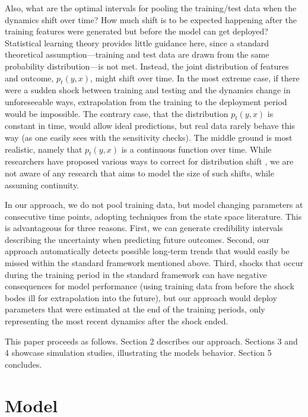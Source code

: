 \documentclass{article}
\begin{document}
Also, what are the optimal intervals for pooling the training/test data when the dynamics shift over time? How much shift is to be expected happening after the training features were generated but before the model can get deployed? Statistical learning theory provides little guidance here, since a standard theoretical assumption---training and test data are drawn from the same probability distribution---is not met. Instead, the joint distribution of features and outcome, $p_t(y, x)$, might shift over time. In the most extreme case, if there were a sudden shock between training and testing and the dynamics change in unforeseeable ways, extrapolation from the training to the deployment period would be impossible. The contrary case, that the distribution $p_t(y, x)$ is constant in time, would allow ideal predictions, but real data rarely behave this way (as one easily sees with the sensitivity checks). The middle ground is most realistic, namely that $p_t(y, x)$ is a continuous function over time. While researchers have proposed various ways to correct for distribution shift \citep[e.g.,][p. 133ff.]{kim_universal_2022, varshney_trustworthy_2021}, we are not aware of any research that aims to model the size of such shifts, while assuming continuity.

In our approach, we do not pool training data, but model changing parameters at consecutive time points, adopting techniques from the state space literature. This is advantageous for three reasons. First, we can generate credibility intervals describing the uncertainty when predicting future outcomes. Second, our approach automatically detects possible long-term trends that would easily be missed within the standard framework mentioned above. Third, shocks that occur during the training period in the standard framework can have negative consequences for model performance (using training data from before the shock bodes ill for extrapolation into the future), but our approach would deploy parameters that were estimated at the end of the training periods, only representing the most recent dynamics after the shock ended.

This paper proceeds as follows. Section 2 describes our approach. Sections 3 and 4 showcase simulation studies, illustrating the models behavior. Section 5 concludes.

\section{Model}\label{sec:model}
\end{document}
